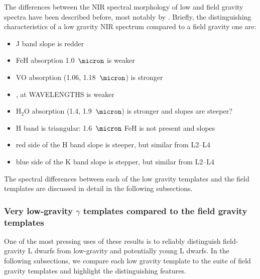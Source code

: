 \documentclass[12pt,preprint]{aastex}
\begin{document}
The differences between the NIR spectral morphology of low and field gravity spectra have been described before, most notably by \citet{Allers:2013hk}. Briefly, the distinguishing characteristics of a low gravity NIR spectrum compared to a field gravity one are:
\begin{itemize}
\item J band slope is redder
\item FeH absorption 1.0~$\micron$ is weaker
\item VO absorption (1.06, 1.18~$\micron$) is stronger
\item {},  at WAVELENGTHS is weaker
\item H$_2$O absorption (1.4, 1.9~$\micron$) is stronger and slopes are steeper?
\item H band is triangular: 1.6~$\micron$ FeH is not present and slopes
\item red side of the H band slope is steeper, but similar from L2--L4 
\item blue side of the K band slope is stepper, but similar from L2--L4 
\end{itemize}
The spectral differences between each of the low gravity templates and the field templates are discussed in detail in the following subsections.

\subsubsection{Very low-gravity $\gamma$ templates compared to the field gravity templates}

One of the most pressing uses of these results is to reliably distinguish field-gravity L dwarfs from low-gravity and potentially young L dwarfs. 
In the following subsections, we compare each low gravity template to the suite of field gravity templates and highlight the distinguishing features.
\end{document}
